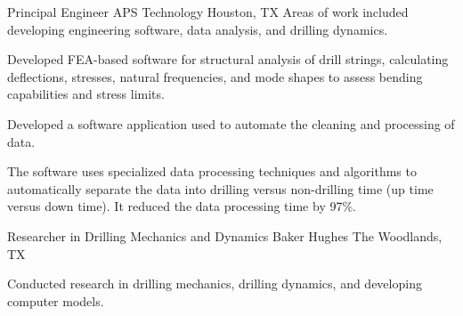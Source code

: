 \documentclass{leresume}
\begin{document}
            {Principal Engineer}
            {APS Technology}
			{Houston, TX}
			Areas of work included developing engineering software, data analysis, and drilling dynamics.\nolinebreak[4]
		\begin{bulletedlist}
			
		\item
		
				Developed FEA-based software for structural analysis of drill strings, calculating deflections, stresses, natural frequencies, and mode shapes to assess bending capabilities and stress limits.
			
		\item
		
				Developed a software application used to automate the cleaning and processing of data.
			
		\begin{bulletedlist}
			
		\item
		
					The software uses specialized data processing techniques and algorithms to automatically separate the data into drilling versus non-drilling time (up time versus down time).
					It reduced the data processing time by 97\%.
				
		\end{bulletedlist}
	
		\end{bulletedlist}
	
            {Researcher in Drilling Mechanics and Dynamics}
            {Baker Hughes}
			{The Woodlands, TX}
			
			Conducted research in drilling mechanics, drilling dynamics, and developing computer models.
		
\end{document}
